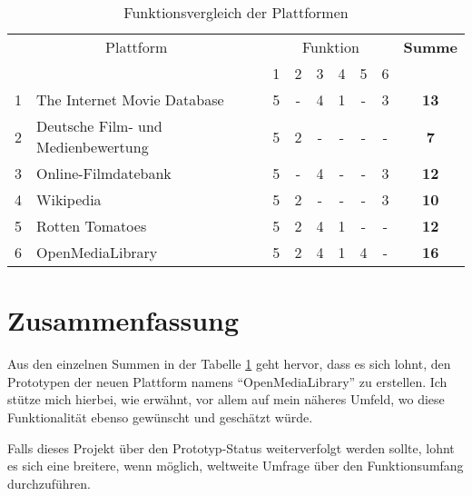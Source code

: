 \begin{table}[h]
\begin{center}
    \begin{tabular}{llccccccc}
        \toprule
        \multicolumn{2}{c}{Plattform} & \multicolumn{6}{c}{Funktion} & \textbf{Summe} \\
        \multicolumn{2}{c}{} & 1 & 2 & 3 & 4 & 5 & 6 & \\ 
        \midrule 1 & The Internet Movie Database & 5 & - & 4 & 1 & - & 3 & \textbf{13} \\
        \midrule 2 & Deutsche Film- und Medienbewertung & 5 & 2 & - & - & - & - & \textbf{7} \\ 
        \midrule 3 & Online-Filmdatebank & 5 & - & 4 & - & - & 3 & \textbf{12} \\ 
        \midrule 4 & Wikipedia & 5 & 2 & - & - & - & 3 & \textbf{10} \\ 
        \midrule 5 & Rotten Tomatoes & 5 & 2 & 4 & 1 & - & - & \textbf{12} \\ 
        \midrule 6 & OpenMediaLibrary & 5 & 2 & 4 & 1 & 4 & - & \textbf{16} \\ 
        \bottomrule
    \end{tabular}
    \caption{Funktionsvergleich der Plattformen}
    \label{tab:funktionen_vergleich}
\end{center}
\end{table}

\section{Zusammenfassung}
Aus den einzelnen Summen in der Tabelle \ref{tab:funktionen_vergleich} geht hervor,
dass es sich lohnt, den Prototypen der neuen Plattform namens ``OpenMediaLibrary'' zu erstellen. 
Ich stütze mich hierbei, wie erwähnt, vor allem auf mein näheres Umfeld, wo diese Funktionalität 
ebenso gewünscht und geschätzt würde.

Falls dieses Projekt über den Prototyp-Status weiterverfolgt werden sollte, lohnt
es sich eine breitere, wenn möglich, weltweite Umfrage über den Funktionsumfang
durchzuführen.